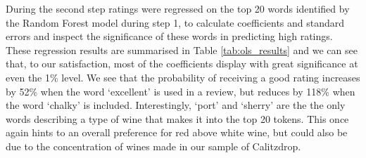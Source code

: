 \documentclass[11pt,preprint]{elsarticle}
\numberwithin{equation}{section}
\numberwithin{figure}{section}
\numberwithin{table}{section}
\begin{document}
During the second step ratings were regressed on the top 20 words
identified by the Random Forest model during step 1, to calculate
coefficients and standard errors and inspect the significance of these
words in predicting high ratings. These regression results are
summarised in Table \ref{tab:ols_results} and we can see that, to our
satisfaction, most of the coefficients display with great significance
at even the 1\% level. We see that the probability of receiving a good
rating increases by 52\% when the word `excellent' is used in a review,
but reduces by 118\% when the word `chalky' is included. Interestingly,
`port' and `sherry' are the the only words describing a type of wine
that makes it into the top 20 tokens. This once again hints to an
overall preference for red above white wine, but could also be due to
the concentration of wines made in our sample of Calitzdrop.
\end{document}

